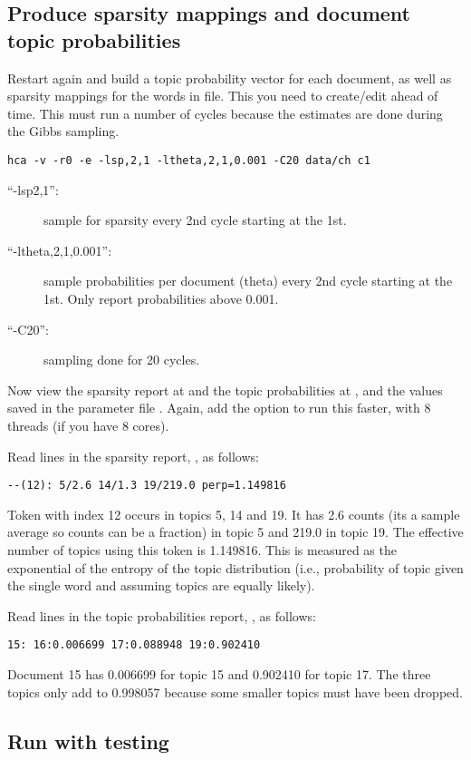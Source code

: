 \documentclass[a4paper,english]{article}
\begin{document}
\subsection{Produce sparsity mappings and document topic probabilities}
Restart again and build a topic probability vector for each document,
as well as sparsity mappings for the words in 
 file.
This you need to create/edit ahead of time.
This must run a number of cycles because the estimates are done 
during the Gibbs sampling.
\begin{verbatim}
hca -v -r0 -e -lsp,2,1 -ltheta,2,1,0.001 -C20 data/ch c1
\end{verbatim} 
\begin{description}
\item[``-lsp2,1'':] sample for sparsity every 2nd cycle
starting at the 1st.
\item[``-ltheta,2,1,0.001'':] sample probabilities per document
(theta) every 2nd cycle
starting at the 1st.
Only report probabilities above 0.001.
\item[``-C20'':] sampling done for 20 cycles.
\end{description}
Now view the sparsity report at  and
the topic probabilities at ,
and the values saved in the parameter file .
Again, add the  option to run this faster,
with 8 threads (if you have 8 cores).

Read lines in the sparsity report, , as follows:
\begin{verbatim}
--(12): 5/2.6 14/1.3 19/219.0 perp=1.149816
\end{verbatim} 
Token with index 12 occurs in topics 5, 14 and 19.
It has 2.6 counts (its a sample average so counts can be a fraction)
in topic 5 and 219.0 in topic 19.
The effective number of topics using this token is 1.149816.
This is measured as the exponential of the entropy of the topic distribution 
(i.e., probability of topic given the single word and assuming topics
are equally likely).

Read lines in the topic probabilities report, , as follows:
\begin{verbatim}
15: 16:0.006699 17:0.088948 19:0.902410
\end{verbatim} 
Document 15 has 0.006699 for topic 15 and 0.902410 for topic 17.
The three topics only add to 0.998057 because some
smaller topics must have been dropped.

\subsection{Run with testing}
\end{document}
